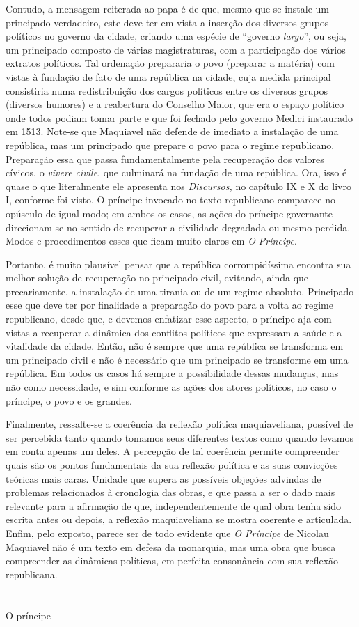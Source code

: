 Contudo, a mensagem reiterada ao papa é de que, mesmo que se instale um
principado verdadeiro, este deve ter em vista a inserção dos diversos
grupos políticos no governo da cidade, criando uma espécie de ``governo
\emph{largo}'', ou seja, um principado composto de várias magistraturas,
com a participação dos vários extratos políticos. Tal ordenação
prepararia o povo (preparar a matéria) com vistas à fundação de fato de
uma república na cidade, cuja medida principal consistiria numa
redistribuição dos cargos políticos entre os diversos grupos (diversos
humores) e a reabertura do Conselho Maior, que era o espaço político
onde todos podiam tomar parte e que foi fechado pelo governo Medici
instaurado em 1513. Note-se que Maquiavel não defende de imediato a
instalação de uma república, mas um principado que prepare o povo para o
regime republicano. Preparação essa que passa fundamentalmente pela
recuperação dos valores cívicos, o \emph{vivere civile}, que culminará
na fundação de uma república. Ora, isso é quase o que literalmente ele
apresenta nos \emph{Discursos,} no capítulo IX e X do livro I, conforme
foi visto. O príncipe invocado no texto republicano comparece no
opúsculo de igual modo; em ambos os casos, as ações do príncipe
governante direcionam-se no sentido de recuperar a civilidade degradada
ou mesmo perdida. Modos e procedimentos esses que ficam muito claros em
\emph{O Príncipe}.

Portanto, é muito plausível pensar que a república corrompidíssima
encontra sua melhor solução de recuperação no principado civil,
evitando, ainda que precariamente, a instalação de uma tirania ou de um
regime absoluto. Principado esse que deve ter por finalidade a
preparação do povo para a volta ao regime republicano, desde que, e
devemos enfatizar esse aspecto, o príncipe aja com vistas a recuperar a
dinâmica dos conflitos políticos que expressam a saúde e a vitalidade da
cidade. Então, não é sempre que uma república se transforma em um
principado civil e não é necessário que um principado se transforme em
uma república. Em todos os casos há sempre a possibilidade dessas
mudanças, mas não como necessidade, e sim conforme as ações dos atores
políticos, no caso o príncipe, o povo e os grandes.

Finalmente, ressalte-se a coerência da reflexão política maquiaveliana,
possível de ser percebida tanto quando tomamos seus diferentes textos
como quando levamos em conta apenas um deles. A percepção de tal
coerência permite compreender quais são os pontos fundamentais da sua
reflexão política e as suas convicções teóricas mais caras. Unidade que
supera as possíveis objeções advindas de problemas relacionados à
cronologia das obras, e que passa a ser o dado mais relevante para a
afirmação de que, independentemente de qual obra tenha sido escrita
antes ou depois, a reflexão maquiaveliana se mostra coerente e
articulada. Enfim, pelo exposto, parece ser de todo evidente que \emph{O
Príncipe} de Nicolau Maquiavel não é um texto em defesa da monarquia,
mas uma obra que busca compreender as dinâmicas políticas, em perfeita
consonância com sua reflexão republicana.

\chapter*{}
\begin{center}
\begin{vplace}[0.3]
\Large
O príncipe
\end{vplace}
\end{center}
\thispagestyle{empty}